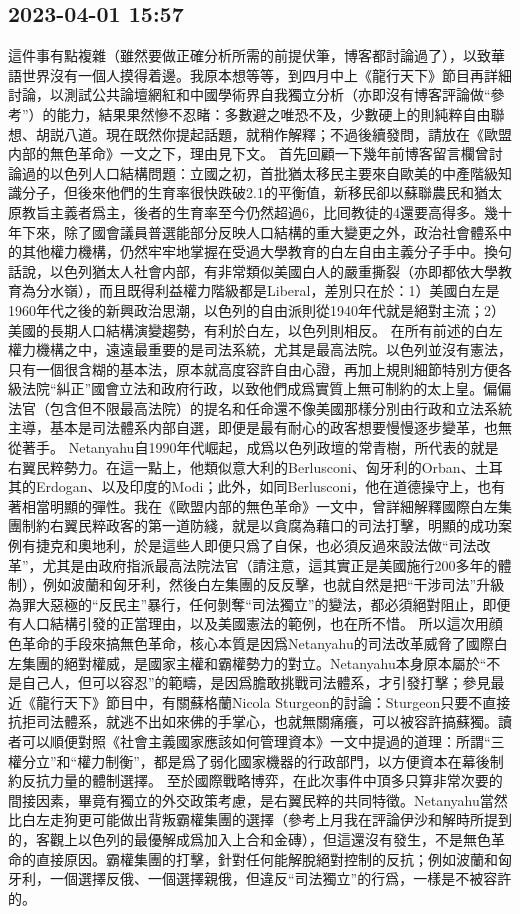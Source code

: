 \documentclass[twocolumn]{ctexart}
\begin{document}
\subsection*{2023-04-01 15:57}

這件事有點複雜（雖然要做正確分析所需的前提伏筆，博客都討論過了），以致華語世界沒有一個人摸得着邊。我原本想等等，到四月中上《龍行天下》節目再詳細討論，以測試公共論壇網紅和中國學術界自我獨立分析（亦即沒有博客評論做“參考”）的能力，結果果然慘不忍睹：多數避之唯恐不及，少數硬上的則純粹自由聯想、胡説八道。現在既然你提起話題，就稍作解釋；不過後續發問，請放在《歐盟内部的無色革命》一文之下，理由見下文。
首先回顧一下幾年前博客留言欄曾討論過的以色列人口結構問題：立國之初，首批猶太移民主要來自歐美的中產階級知識分子，但後來他們的生育率很快跌破2.1的平衡值，新移民卻以蘇聯農民和猶太原教旨主義者爲主，後者的生育率至今仍然超過6，比囘教徒的4還要高得多。幾十年下來，除了國會議員普選能部分反映人口結構的重大變更之外，政治社會體系中的其他權力機構，仍然牢牢地掌握在受過大學教育的白左自由主義分子手中。換句話說，以色列猶太人社會内部，有非常類似美國白人的嚴重撕裂（亦即都依大學教育為分水嶺），而且既得利益權力階級都是Liberal，差別只在於：1）美國白左是1960年代之後的新興政治思潮，以色列的自由派則從1940年代就是絕對主流；2）美國的長期人口結構演變趨勢，有利於白左，以色列則相反。
在所有前述的白左權力機構之中，遠遠最重要的是司法系統，尤其是最高法院。以色列並沒有憲法，只有一個很含糊的基本法，原本就高度容許自由心證，再加上規則細節特別方便各級法院“糾正”國會立法和政府行政，以致他們成爲實質上無可制約的太上皇。偏偏法官（包含但不限最高法院）的提名和任命還不像美國那樣分別由行政和立法系統主導，基本是司法體系内部自選，即便是最有耐心的政客想要慢慢逐步變革，也無從著手。
Netanyahu自1990年代崛起，成爲以色列政壇的常青樹，所代表的就是右翼民粹勢力。在這一點上，他類似意大利的Berlusconi、匈牙利的Orban、土耳其的Erdogan、以及印度的Modi；此外，如同Berlusconi，他在道德操守上，也有著相當明顯的彈性。我在《歐盟内部的無色革命》一文中，曾詳細解釋國際白左集團制約右翼民粹政客的第一道防綫，就是以貪腐為藉口的司法打擊，明顯的成功案例有捷克和奧地利，於是這些人即便只爲了自保，也必須反過來設法做“司法改革”，尤其是由政府指派最高法院法官（請注意，這其實正是美國施行200多年的體制），例如波蘭和匈牙利，然後白左集團的反反擊，也就自然是把“干涉司法”升級為罪大惡極的“反民主”暴行，任何剝奪“司法獨立”的變法，都必須絕對阻止，即便有人口結構引發的正當理由，以及美國憲法的範例，也在所不惜。
所以這次用顔色革命的手段來搞無色革命，核心本質是因爲Netanyahu的司法改革威脅了國際白左集團的絕對權威，是國家主權和霸權勢力的對立。Netanyahu本身原本屬於“不是自己人，但可以容忍”的範疇，是因爲膽敢挑戰司法體系，才引發打擊；參見最近《龍行天下》節目中，有關蘇格蘭Nicola Sturgeon的討論：Sturgeon只要不直接抗拒司法體系，就逃不出如來佛的手掌心，也就無關痛癢，可以被容許搞蘇獨。讀者可以順便對照《社會主義國家應該如何管理資本》一文中提過的道理：所謂“三權分立”和“權力制衡”，都是爲了弱化國家機器的行政部門，以方便資本在幕後制約反抗力量的體制選擇。
至於國際戰略博弈，在此次事件中頂多只算非常次要的間接因素，畢竟有獨立的外交政策考慮，是右翼民粹的共同特徵。Netanyahu當然比白左走狗更可能做出背叛霸權集團的選擇（參考上月我在評論伊沙和解時所提到的，客觀上以色列的最優解成爲加入上合和金磚），但這還沒有發生，不是無色革命的直接原因。霸權集團的打擊，針對任何能解脫絕對控制的反抗；例如波蘭和匈牙利，一個選擇反俄、一個選擇親俄，但違反“司法獨立”的行爲，一樣是不被容許的。
\end{document}
